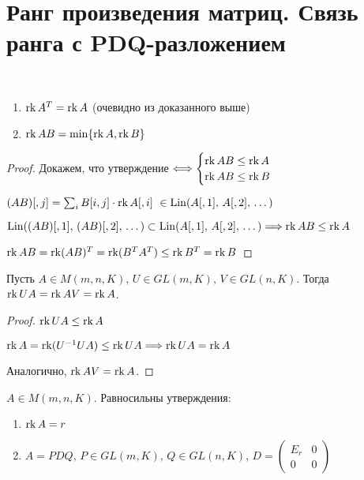 
\section{Ранг произведения матриц. Связь ранга с PDQ-разложением}

\begin{theorem-non} 
    \
    \begin{enumerate}
        \item $\operatorname{rk} A^T = \operatorname{rk} A$ (очевидно из доказанного выше)
        \item $\operatorname{rk} AB = \min \{\operatorname{rk} A, \operatorname{rk} B\}$
    \end{enumerate}

    \begin{proof}
        
        Докажем, что утверждение $\Longleftrightarrow
        \begin{cases}
            \operatorname{rk} AB \leq \operatorname{rk} A\\
            \operatorname{rk} AB \leq \operatorname{rk} B
        \end{cases}$

        $(AB)[, j] = \sum_i B[i,j] \cdot \operatorname{rk} A[, i] \ \in \operatorname{Lin}(A[, 1],\, A[, 2],\, \dots)$

        $\operatorname{Lin}((AB)[, 1],\, (AB)[, 2],\, \dots) \subset \operatorname{Lin}(A[, 1],\, A[, 2],\, \dots) \Longrightarrow \operatorname{rk} AB \leq \operatorname{rk} A$

        $\operatorname{rk} AB = \operatorname{rk} (AB)^T = \operatorname{rk} (B^T A^T) \leq \operatorname{rk} B^T = \operatorname{rk} B$

    \end{proof}

\end{theorem-non}

\follow Пусть $A \in M(m, n, K),\, U \in GL(m, K),\, V \in GL(n, K)$. Тогда $\operatorname{rk} UA = \operatorname{rk} AV = \operatorname{rk} A$.
\begin{proof}
    
    $\operatorname{rk} UA \leq \operatorname{rk} A$

    $\operatorname{rk} A = \operatorname{rk}(U^{-1}UA) \leq \operatorname{rk} UA \Longrightarrow \operatorname{rk} UA = \operatorname{rk} A$

    Аналогично, $\operatorname{rk} AV = \operatorname{rk} A$.

\end{proof}

\follow $A \in M(m, n, K)$. Равносильны утверждения:
\begin{enumerate}
    \item $\operatorname{rk} A = r$
    \item $A = PDQ,\, P \in GL(m, K),\, Q \in GL(n, K),\, D =
    \begin{pmatrix}
        E_r & 0\\
        0 & 0
    \end{pmatrix}$
\end{enumerate}

